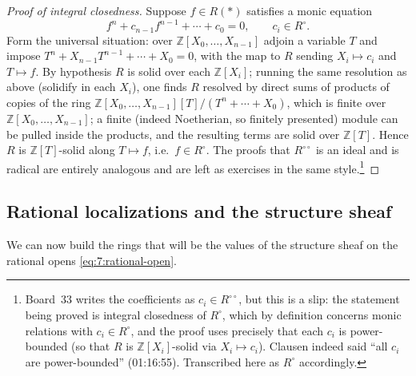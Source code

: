 \begin{proof}[Proof of integral closedness]
Suppose $f\in R(\ast)$ satisfies a monic equation
\begin{equation*}
f^{n}+c_{n-1}f^{n-1}+\cdots+c_{0}=0,\qquad c_i\in R^{\circ}.
\end{equation*}
Form the universal situation: over $\mathbb{Z}[X_0,\dots,X_{n-1}]$ adjoin a
variable $T$ and impose $T^{n}+X_{n-1}T^{n-1}+\cdots+X_0=0$, with the map to
$R$ sending $X_i\mapsto c_i$ and $T\mapsto f$. By hypothesis $R$ is solid over
each $\mathbb{Z}[X_i]$; running the same resolution as above (solidify in each
$X_i$), one finds $R$ resolved by direct sums of products of copies of the
ring $\mathbb{Z}[X_0,\dots,X_{n-1}][T]/(T^n+\cdots+X_0)$, which is finite over
$\mathbb{Z}[X_0,\dots,X_{n-1}]$; a finite (indeed Noetherian, so finitely
presented) module can be pulled inside the products, and the resulting terms are
solid over $\mathbb{Z}[T]$. Hence $R$ is $\mathbb{Z}[T]$-solid along
$T\mapsto f$, i.e.\ $f\in R^{\circ}$. The proofs that $R^{\circ\circ}$ is an
ideal and is radical are entirely analogous and are left as exercises in the
same style.\footnote{Board~33 writes the coefficients as $c_i\in
R^{\circ\circ}$, but this is a slip: the statement being proved is integral
closedness of $R^{\circ}$, which by definition concerns monic relations with
$c_i\in R^{\circ}$, and the proof uses precisely that each $c_i$ is
power-bounded (so that $R$ is $\mathbb{Z}[X_i]$-solid via $X_i\mapsto c_i$).
Clausen indeed said ``all $c_i$ are power-bounded'' (01:16:55). Transcribed here
as $R^{\circ}$ accordingly.}
\end{proof}

\subsection{Rational localizations and the structure sheaf}

We can now build the rings that will be the values of the structure sheaf on
the rational opens \eqref{eq:7:rational-open}.


